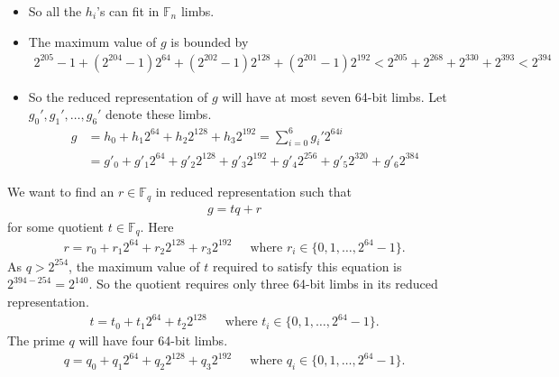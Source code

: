 \documentclass[a4paper, 12pt]{article}
\begin{document}
\begin{itemize}
\begin{itemize}
    \end{itemize}
  \item So all the $h_i$'s can fit in $\mathbb{F}_n$ limbs.
  \item The maximum value of $g$ is bounded by
    \begin{align*}
      2^{205} - 1 + \left(2^{204} - 1\right) 2^{64}+ \left( 2^{202}-1 \right)2^{128}+ \left( 2^{201}-1 \right)2^{192} < 2^{205} + 2^{268} + 2^{330} + 2^{393} < 2^{394}
    \end{align*}
  \item So the reduced representation of $g$ will have at most seven 64-bit limbs. Let $g_0', g_1',\ldots,g_6'$ denote these limbs.
   \begin{align*}
   g & = h_0 + h_1 2^{64} + h_2 2^{128} + h_3 2^{192} = \sum^{6}_{i=0} g_i' 2^{64i}\\
     & = g'_0 + g'_1 2^{64} + g'_2 2^{128} + g'_3 2^{192} + g'_4 2^{256} +   g'_5 2^{320} + g'_6 2^{384}
   \end{align*}
\end{itemize}

We want to find an $r \in \mathbb{F}_q$ in reduced representation such that 
\begin{align}
  g = tq+r
  \label{eqn:g_equals_tq_plus_r}
\end{align}
for some quotient $t \in \mathbb{F}_q$. Here
\begin{align*}
  r = r_0 + r_1 2^{64} + r_2 2^{128} + r_3 2^{192} \ \ \ \ \ \text{ where } r_i \in \{0,1,\ldots,2^{64}-1\}.
\end{align*}
As $q > 2^{254}$, the maximum value of $t$ required to satisfy this equation is $2^{394-254} = 2^{140}$. So the quotient requires only three 64-bit limbs in its reduced representation.
\begin{align*}
  t = t_0 + t_1 2^{64} + t_2 2^{128}\ \ \ \ \ \text{ where } t_i \in \{0,1,\ldots,2^{64}-1\}.
\end{align*}
The prime $q$ will have four 64-bit limbs.
\begin{align*}
  q = q_0 + q_1 2^{64} + q_2 2^{128} + q_3 2^{192} \ \ \ \ \ \text{ where } q_i \in \{0,1,\ldots,2^{64}-1\}.
\end{align*}
\end{document}
